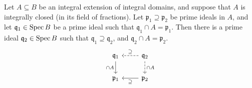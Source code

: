 \begin{theorem}
    Let \( A \subseteq B \) be an integral extension of integral domains, and suppose that \( A \) is integrally closed (in its field of fractions).
    Let \( \mathfrak p_1 \supseteq \mathfrak p_2 \) be prime ideals in \( A \), and let \( \mathfrak q_1 \in \operatorname{Spec} B \) be a prime ideal such that \( \mathfrak q_1 \cap A = \mathfrak p_1 \).
    Then there is a prime ideal \( \mathfrak q_2 \in \operatorname{Spec} B \) such that \( \mathfrak q_1 \supseteq \mathfrak q_2 \), and \( \mathfrak q_2 \cap A = \mathfrak p_2 \).
\[\begin{tikzcd}
	{\mathfrak q_1} & {\mathfrak q_2} \\
	{\mathfrak p_1} & {\mathfrak p_2}
	\arrow["\supseteq"', dashed, from=1-2, to=1-1]
	\arrow["{\cap A}", dashed, from=1-2, to=2-2]
	\arrow["{\cap A}"', from=1-1, to=2-1]
	\arrow["\supseteq", from=2-2, to=2-1]
\end{tikzcd}\]
\end{theorem}

